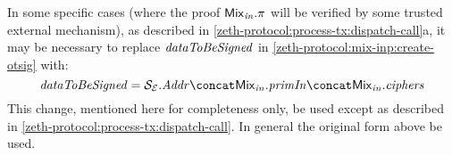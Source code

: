 \begin{remark}\label{zeth-protocol:mix-inp:otsig-for-dispatch-call}
  In some specific cases (where the proof $\mathit{{\mathsf{Mix}}_{in}}.\mathit{\pi}$ will be verified by some trusted external mechanism), as described in \cref{zeth-protocol:process-tx:dispatch-call}a, it may be necessary to replace $\mathit{dataToBeSigned}$ in \cref{zeth-protocol:mix-inp:create-otsig} with:
  \[
  \datatobesigned = \eparty{S}.\addr \concat \inp{\mix}.\primInp \concat \inp{\mix}.\ciphers
  \]
  This change, mentioned here for completeness only, \MUSTNOT{} be used except as described in \cref{zeth-protocol:process-tx:dispatch-call}.  In general the original form above \MUST{} be used.
\end{remark}
